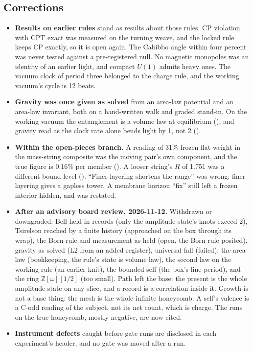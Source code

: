 \subsection{Corrections}

\begin{itemize}
\item \textbf{Results on earlier rules} stand as results about those rules. CP violation with CPT exact was measured on
the turning weave, and the locked rule keeps CP exactly, so it is open again. The Cabibbo angle within four percent was
never tested against a pre-registered null. No magnetic monopoles was an identity of an earlier light, and compact
$U(1)$ admits heavy ones. The vacuum clock of period three belonged to the charge rule, and the working vacuum's cycle
is 12 beats.
\item \textbf{Gravity was once given as solved} from an area-law potential and an area-law invariant, both on a
hand-written walk and graded stand-in. On the working vacuum the entanglement is a volume law at equilibrium
(), and gravity read as the clock rate alone bends light by 1, not 2 ().
\item \textbf{Within the open-pieces branch.} A reading of 31\% frozen flat weight in the mass-string composite was
the moving pair's own component, and the true figure is 0.16\% per member (). A looser string's $R$
of 1.751 was a different bound level (). ``Finer layering shortens the range'' was wrong: finer
layering gives a gapless tower. A membrane horizon ``fix'' still left a frozen interior hidden, and was restated.
\item \textbf{After an advisory board review, 2026-11-12.} Withdrawn or downgraded: Bell held in records (only the
amplitude state's knots exceed 2), Tsirelson reached by a finite history (approached on the box through its wrap),
the Born rule and measurement as held (open, the Born rule posited), gravity as solved (L2 from an added register),
universal fall (failed), the area law (bookkeeping, the rule's state is volume law), the second law on the working
rule (an earlier knit), the bounded self (the box's line period), and the ring $\mathbb{Z}[\omega][1/2]$ (too
small). Path left the base: the present is the whole amplitude state on any slice, and a record is a correlation
inside it. Growth is not a base thing: the mesh is the whole infinite honeycomb. A self's valence is a C-odd reading
of the subject, not its net count, which is charge. The runs on the true honeycomb, mostly negative, are now cited.
\item \textbf{Instrument defects} caught before gate runs are disclosed in each experiment's header, and no gate was
moved after a run.
\end{itemize}
